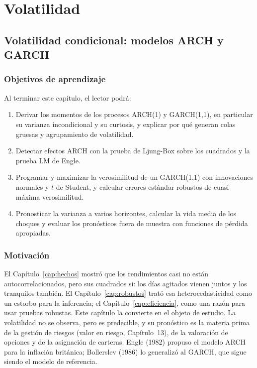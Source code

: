 \part{Volatilidad}
\chapter[Modelos ARCH y GARCH]{Volatilidad condicional: modelos ARCH y GARCH}\label{cap:garch}

\section*{Objetivos de aprendizaje}
Al terminar este capítulo, el lector podrá:
\begin{enumerate}[label=\arabic*.,leftmargin=*]
  \item Derivar los momentos de los procesos ARCH(1) y GARCH(1,1), en particular su varianza incondicional y
        su curtosis, y explicar por qué generan colas gruesas y agrupamiento de volatilidad.
  \item Detectar efectos ARCH con la prueba de Ljung-Box sobre los cuadrados y la prueba LM de Engle.
  \item Programar y maximizar la verosimilitud de un GARCH(1,1) con innovaciones normales y $t$ de Student, y
        calcular errores estándar robustos de cuasi máxima verosimilitud.
  \item Pronosticar la varianza a varios horizontes, calcular la vida media de los choques y evaluar los
        pronósticos fuera de muestra con funciones de pérdida apropiadas.
\end{enumerate}

\section*{Motivación}
El Capítulo~\ref{cap:hechos} mostró que los rendimientos casi no están autocorrelacionados, pero sus cuadrados
sí: los días agitados vienen juntos y los tranquilos también. El Capítulo~\ref{cap:robustos} trató esa
heterocedasticidad como un estorbo para la inferencia; el Capítulo~\ref{cap:eficiencia}, como una razón para
usar pruebas robustas. Este capítulo la convierte en el objeto de estudio. La volatilidad no se observa, pero
es predecible, y su pronóstico es la materia prima de la gestión de riesgos (valor en riesgo, Capítulo~13), de
la valoración de opciones y de la asignación de carteras. Engle (1982) propuso el modelo ARCH para la inflación
británica; Bollerslev (1986) lo generalizó al GARCH, que sigue siendo el modelo de referencia.

